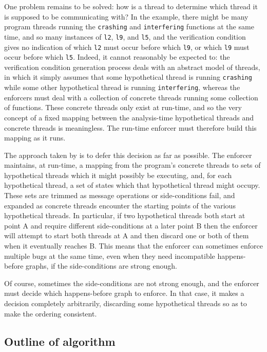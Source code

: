 One problem remains to be solved: how is a thread to determine which
thread it is supposed to be communicating with?  In the example, there
might be many program threads running the \texttt{crashing} and
\texttt{interfering} functions at the same time, and so many instances
of \texttt{l2}, \texttt{l9}, and \texttt{l5}, and the verification
condition gives no indication of which \texttt{l2} must occur before
which \texttt{l9}, or which \texttt{l9} must occur before which
\texttt{l5}.  Indeed, it cannot reasonably be expected to: the
verification condition generation process deals with an abstract model
of threads, in which it simply assumes that some hypothetical thread
is running \texttt{crashing} while some other hypothetical thread is
running \texttt{interfering}, whereas the enforcers must deal with a
collection of concrete threads running some collection of functions.
These concrete threads only exist at run-time, and so the very concept
of a fixed mapping between the analysis-time hypothetical threads and
concrete threads is meaningless.  The run-time enforcer
must therefore build this mapping as it runs.

The approach taken by {\technique} is to defer this decision as far as
possible.  The enforcer maintains, at run-time, a mapping from the
program's concrete threads to sets of hypothetical threads which it
might possibly be executing, and, for each hypothetical thread, a set
of states which that hypothetical thread might occupy.  These sets are
trimmed as message operations or side-conditions fail, and expanded as
concrete threads encounter the starting points of the various
hypothetical threads.  In particular, if two hypothetical threads both
start at point A and require different side-conditions at a later
point B then the enforcer will attempt to start both threads at A and
then discard one or both of them when it eventually reaches B.  This
means that the enforcer can sometimes enforce multiple bugs at the
same time, even when they need incompatible happens-before graphs, if
the side-conditions are strong enough.

Of course, sometimes the side-conditions are not strong enough, and
the enforcer must decide which happens-before graph to enforce.  In
that case, it makes a decision completely arbitrarily, discarding some
hypothetical threads so as to make the ordering consistent.

\subsection{Outline of algorithm}

